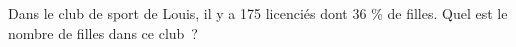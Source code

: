\documentclass[exercice]{thedocument}%
\begin{document}
%
Dans le club de sport de Louis, il y a 175 licenciés dont 36 \% de filles.
\vskip5pt\noindent Quel est le nombre de filles dans ce club~?
\end{document}
